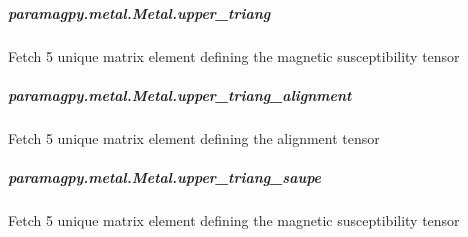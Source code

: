 \documentclass[a4paper,10pt,english,openany,oneside]{sphinxmanual}
\begin{document}
\begin{fulllineitems}
\begin{fulllineitems}
\subparagraph{paramagpy.metal.Metal.upper\_triang}
\label{\detokenize{reference/generated/paramagpy.metal.Metal.upper_triang:paramagpy-metal-metal-upper-triang}}\label{\detokenize{reference/generated/paramagpy.metal.Metal.upper_triang::doc}}

\begin{fulllineitems}
\label{\detokenize{reference/generated/paramagpy.metal.Metal.upper_triang:paramagpy.metal.Metal.upper_triang}}
Fetch 5 unique matrix element defining the magnetic
susceptibility tensor

\end{fulllineitems}



\subparagraph{paramagpy.metal.Metal.upper\_triang\_alignment}
\label{\detokenize{reference/generated/paramagpy.metal.Metal.upper_triang_alignment:paramagpy-metal-metal-upper-triang-alignment}}\label{\detokenize{reference/generated/paramagpy.metal.Metal.upper_triang_alignment::doc}}

\begin{fulllineitems}
\label{\detokenize{reference/generated/paramagpy.metal.Metal.upper_triang_alignment:paramagpy.metal.Metal.upper_triang_alignment}}
Fetch 5 unique matrix element defining the alignment tensor

\end{fulllineitems}



\subparagraph{paramagpy.metal.Metal.upper\_triang\_saupe}
\label{\detokenize{reference/generated/paramagpy.metal.Metal.upper_triang_saupe:paramagpy-metal-metal-upper-triang-saupe}}\label{\detokenize{reference/generated/paramagpy.metal.Metal.upper_triang_saupe::doc}}

\begin{fulllineitems}
\label{\detokenize{reference/generated/paramagpy.metal.Metal.upper_triang_saupe:paramagpy.metal.Metal.upper_triang_saupe}}
Fetch 5 unique matrix element defining the magnetic
susceptibility tensor


\end{fulllineitems}
\end{fulllineitems}
\end{fulllineitems}
\end{document}
